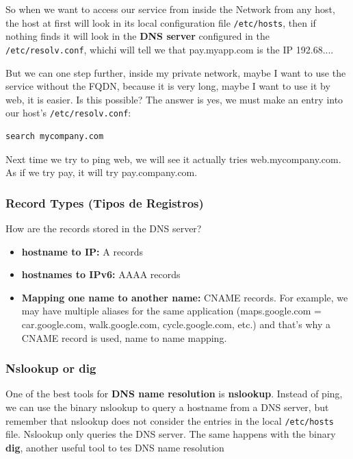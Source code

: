 \documentclass{article}
\newenvironment{codetemplate}[1][]{%
  \mybasecolorbox[#1]
  \itshape
}{%
  \endmybasecolorbox
}
\begin{document}
So when we want to access our service from inside the Network from any host, the host at first will look in its local configuration file \verb|/etc/hosts|, then if nothing finds it will look in the \textbf{DNS server} configured in the \verb|/etc/resolv.conf|, whichi will tell we that pay.myapp.com is the IP 192.68....

But we can one step further, inside my private network, maybe I want to use the service without the FQDN, because it is very long, maybe I want to use it by web, it is easier. Is this possible? The answer is yes, we must make an entry into our host's \verb|/etc/resolv.conf|:

\begin{codetemplate}{}
\begin{verbatim}
search mycompany.com
\end{verbatim}
\end{codetemplate}

Next time we try to ping web, we will see it actually tries web.mycompany.com. As if we try pay, it will try pay.company.com.

\subsubsection{Record Types (Tipos de Registros)}

How are the records stored in the DNS server?

\begin{itemize}
    \item \textbf{hostname to IP:} A records
    \item \textbf{hostnames to IPv6:} AAAA records
    \item \textbf{Mapping one name to another name:} CNAME records. For example, we may have multiple aliases for the same application (maps.google.com = car.google.com, walk.google.com, cycle.google.com, etc.) and that's why a CNAME record is used, name to name mapping.
\end{itemize}

\subsubsection{Nslookup or dig}
One of the best tools for \textbf{DNS name resolution} is \textbf{nslookup}. Instead of ping, we can use the binary nslookup to query a hostname from a DNS server, but remember that nslookup does not consider the entries in the local \verb|/etc/hosts| file. Nslookup only queries the DNS server. The same happens with the binary \textbf{dig}, another useful tool to tes DNS name resolution
\end{document}
